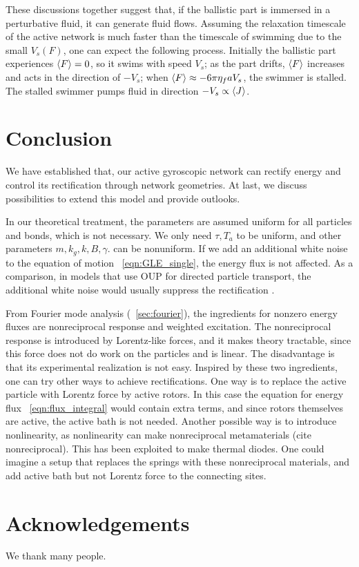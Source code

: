 \documentclass[
 preprint,
 preprintnumbers,
 amsmath,amssymb,
 aps,
 pre,
 longbibliography,
 superscriptaddress,
 10pt, twocolumn
]{revtex4-1}
\begin{document}
These discussions together suggest that, if the ballistic part is immersed in a perturbative fluid, it can generate fluid flows.
Assuming the relaxation timescale of the active network is much faster than the timescale of swimming due to the small $V_s(F)$, one can expect the following process. Initially the ballistic part experiences $\expval{F}=0$, so it swims with speed $V_s$; as the part drifts, $\expval{F}$ increases and acts in the direction of $-V_s$; when $\expval{F} \approx -6\pi\eta_f a V_s$, the swimmer is stalled. The stalled swimmer pumps fluid in direction $-V_s \propto \expval{J}$.


\section{Conclusion} \label{sec:conclusion}

We have established that, our active gyroscopic network can rectify energy and control its rectification through network geometries.
At last, we discuss possibilities to extend this model and provide outlooks.

In our theoretical treatment, the parameters are assumed uniform for all particles and bonds, which is not necessary. We only need $\tau,T_a$ to be uniform, and other parameters $m, k_g, k, B, \gamma$. can be nonuniform.
If we add an additional white noise to the equation of motion \eqnname~\eqref{eqn:GLE_single}, the energy flux is not affected. As a comparison, in models that use OUP for directed particle transport, the additional white noise would usually suppress the rectification \cite{Bartussek1996PreciseNumerics}.

From Fourier mode analysis (\secname~\ref{sec:fourier}), the ingredients for nonzero energy fluxes are nonreciprocal response and weighted excitation.
The nonreciprocal response is introduced by Lorentz-like forces, and it makes theory tractable, since this force does not do work on the particles and is linear. The disadvantage is that its experimental realization is not easy.
Inspired by these two ingredients, one can try other ways to achieve rectifications.
One way is to replace the active particle with Lorentz force by active rotors. In this case the equation for energy flux \eqnname~\eqref{eqn:flux_integral} would contain extra terms, and since rotors themselves are active, the active bath is not needed.
Another possible way is to introduce nonlinearity, as nonlinearity can make nonreciprocal metamaterials  (cite nonreciprocal). This has been exploited to make thermal diodes. One could imagine a setup that replaces the springs with these nonreciprocal materials, and add active bath but not Lorentz force to the connecting sites.



\section*{Acknowledgements}
We thank many people.



\end{document}
